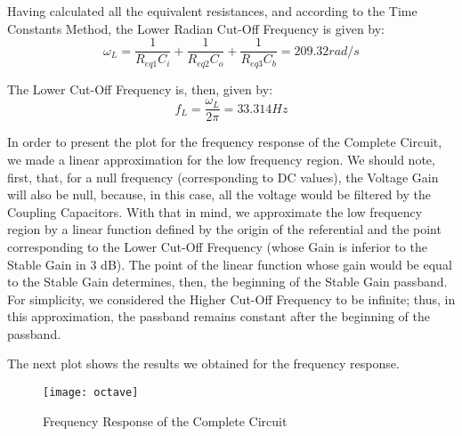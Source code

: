 Having calculated all the equivalent resistances, and according to the Time Constants Method, the Lower Radian Cut-Off Frequency is given by:
\begin{equation}
\omega_L = \frac{1}{R_{eq1} C_i} + \frac{1}{R_{eq2} C_o} + \frac{1}{R_{eq3} C_b} = 209.32 rad/s
\label{eq:omegaL}
\end{equation}

The Lower Cut-Off Frequency is, then, given by:
\begin{equation}
f_L = \frac{\omega_L}{2 \pi} = 33.314 Hz
\label{eq:freqL}
\end{equation}

In order to present the plot for the frequency response of the Complete Circuit, we made a linear approximation for the low frequency region. We should note, first, that, for a null frequency (corresponding to DC values), the Voltage Gain will also be null, because, in this case, all the voltage would be filtered by the Coupling Capacitors. With that in mind, we approximate the low frequency region by a linear function defined by the origin of the referential and the point corresponding to the Lower Cut-Off Frequency (whose Gain is inferior to the Stable Gain in 3 dB). The point of the linear function whose gain would be equal to the Stable Gain determines, then, the beginning of the Stable Gain passband. For simplicity, we considered the Higher Cut-Off Frequency to be infinite; thus, in this approximation, the passband remains constant after the beginning of the passband. 

The next plot shows the results we obtained for the frequency response.

\begin{figure}[h] \centering
\texttt{[image: octave]}
\caption{Frequency Response of the Complete Circuit}
\label{fig:freqResp}
\end{figure}